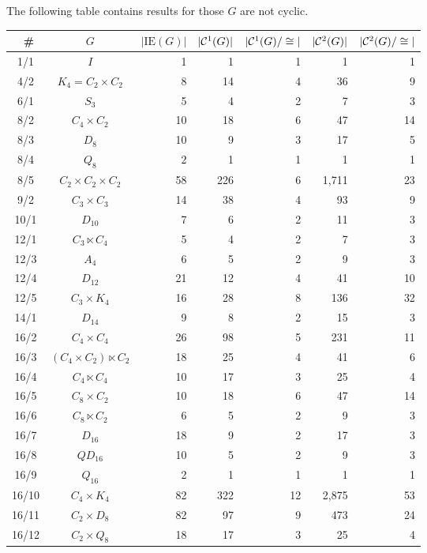 \documentclass[a4paper,11pt]{article}
\theoremstyle{plain}
\theoremstyle{definition}
\begin{document}
The following table contains results for those $G$ are not cyclic. 
\begin{longtable}{ccrrrrr}
	\hline 
	{\GAP\ }\# 
	    & $G$ 
	        & $|\mathrm{IE}(G)|$ 
	            & $|\mathcal{C}^1(G)|$ 
	                & $|\mathcal{C}^1(G)/\cong |$ 
	                    & $|\mathcal{C}^{2}(G)|$ 
	                        & $|\mathcal{C}^{2}(G)/\cong |$  \\ 
	\hline
	1/1 & $I$ & 1 & 1 & 1 & 1 & 1 \\ 
	4/2 & $K_4 = C_2 \times C_2$ & 8 & 14 & 4 & 36 & 9 \\ 
	6/1 & $S_3$ & 5 & 4 & 2 & 7 & 3 \\ 
	8/2 & $C_4 \times C_2$ & 10 & 18 & 6 & 47 & 14 \\ 
	8/3 & $D_8$ & 10 & 9 & 3 & 17 & 5 \\ 
	8/4 & $Q_8$ & 2 & 1 & 1 & 1 & 1 \\ 
	8/5 & $C_2 \times C_2 \times C_2$ & 58 & 226 & 6 & 1,711 & 23 \\ 
	9/2 & $C_3 \times C_3$ & 14 & 38 & 4 & 93 & 9 \\ 
	10/1 & $D_{10}$ & 7 & 6 & 2 & 11 & 3 \\ 
	12/1 & $C_3 \ltimes C_4$ & 5 & 4 & 2 & 7 & 3 \\ 
	12/3 & $A_4$ & 6 & 5 & 2 & 9 & 3 \\ 
	12/4 & $D_{12}$ & 21 & 12 & 4 & 41 & 10 \\ 
	12/5 & $C_3 \times K_4$ & 16 & 28 & 8 & 136 & 32 \\ 
	14/1 & $D_{14}$ & 9 & 8 & 2 & 15 & 3 \\ 
	16/2 & $C_4 \times C_4$ & 26 & 98 & 5 & 231 & 11 \\ 
	16/3 & $(C_4 \times C_2) \ltimes C_2$ & 18 & 25 & 4 & 41 & 6 \\ 
	16/4 & $C_4 \ltimes C_4$ & 10 & 17 & 3 & 25 & 4 \\ 
	16/5 & $C_8 \times C_2$ & 10 & 18 & 6 & 47 & 14 \\ 
	16/6 & $C_8 \ltimes C_2$ & 6 & 5 & 2 & 9 & 3 \\ 
	16/7 & $D_{16}$ & 18 & 9 & 2 & 17 & 3 \\ 
	16/8 & $QD_{16}$ & 10 & 5 & 2 & 9 & 3 \\ 
	16/9 & $Q_{16}$ & 2 & 1 & 1 & 1 & 1 \\ 
	16/10 & $C_4 \times K_4$ & 82 & 322 & 12 & 2,875 & 53 \\ 
	16/11 & $C_2 \times D_8$ & 82 & 97 & 9 & 473 & 24 \\ 
	16/12 & $C_2 \times Q_8$ & 18 & 17 & 3 & 25 & 4 \\ 

\end{longtable}
\end{document}
